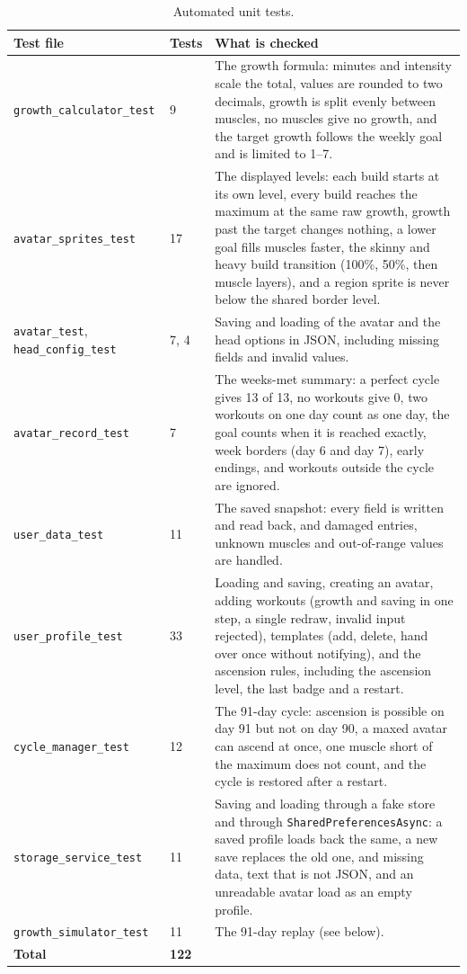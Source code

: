 \documentclass[11pt]{article}
\begin{document}
\begin{table}[H]
\centering
\renewcommand{\arraystretch}{1.3}
\begin{tabular}{|p{}|p{}|p{}|}
\hline
\textbf{Test file} & \textbf{Tests} & \textbf{What is checked} \\ \hline
\texttt{growth\_calculator\_test} & 9 & The growth formula: minutes and intensity scale the total, values are rounded to two decimals, growth is split evenly between muscles, no muscles give no growth, and the target growth follows the weekly goal and is limited to 1--7. \\ \hline
\texttt{avatar\_sprites\_test} & 17 & The displayed levels: each build starts at its own level, every build reaches the maximum at the same raw growth, growth past the target changes nothing, a lower goal fills muscles faster, the skinny and heavy build transition (100\%, 50\%, then muscle layers), and a region sprite is never below the shared border level. \\ \hline
\texttt{avatar\_test}, \texttt{head\_config\_test} & 7, 4 & Saving and loading of the avatar and the head options in JSON, including missing fields and invalid values. \\ \hline
\texttt{avatar\_record\_test} & 7 & The weeks-met summary: a perfect cycle gives 13 of 13, no workouts give 0, two workouts on one day count as one day, the goal counts when it is reached exactly, week borders (day 6 and day 7), early endings, and workouts outside the cycle are ignored. \\ \hline
\texttt{user\_data\_test} & 11 & The saved snapshot: every field is written and read back, and damaged entries, unknown muscles and out-of-range values are handled. \\ \hline
\texttt{user\_profile\_test} & 33 & Loading and saving, creating an avatar, adding workouts (growth and saving in one step, a single redraw, invalid input rejected), templates (add, delete, hand over once without notifying), and the ascension rules, including the ascension level, the last badge and a restart. \\ \hline
\texttt{cycle\_manager\_test} & 12 & The 91-day cycle: ascension is possible on day 91 but not on day 90, a maxed avatar can ascend at once, one muscle short of the maximum does not count, and the cycle is restored after a restart. \\ \hline
\texttt{storage\_service\_test} & 11 & Saving and loading through a fake store and through \texttt{SharedPreferencesAsync}: a saved profile loads back the same, a new save replaces the old one, and missing data, text that is not JSON, and an unreadable avatar load as an empty profile. \\ \hline
\texttt{growth\_simulator\_test} & 11 & The 91-day replay (see below). \\ \hline
\textbf{Total} & \textbf{122} & \\ \hline
\end{tabular}
\caption{Automated unit tests.}
\label{tab:tests}
\end{table}
\end{document}
